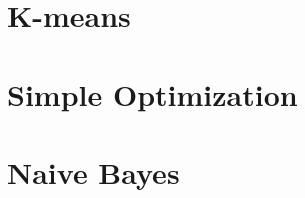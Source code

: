 \documentclass{article}
\begin{document}
\maketitle

\section{K-means}


\section{Simple Optimization}


\section{Naive Bayes}
\end{document}
